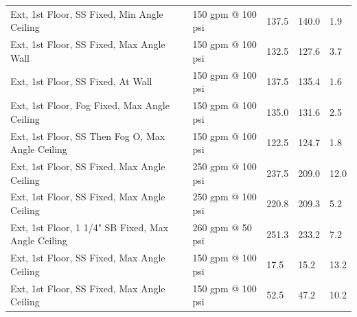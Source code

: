\documentclass{article}
\begin{document}
\begin{table}[]
\begin{tabular}{lllll}
Ext, 1st Floor, SS Fixed, Min Angle Ceiling           & 150 gpm @ 100 psi                   & 137.5                                  & 140.0                                   & 1.9                                     \\
Ext, 1st Floor, SS Fixed, Max Angle Wall              & 150 gpm @ 100 psi                   & 132.5                                  & 127.6                                   & 3.7                                     \\
Ext, 1st Floor, SS Fixed, At Wall                     & 150 gpm @ 100 psi                   & 137.5                                  & 135.4                                   & 1.6                                     \\
Ext, 1st Floor, Fog Fixed, Max Angle Ceiling          & 150 gpm @ 100 psi                   & 135.0                                  & 131.6                                   & 2.5                                     \\
Ext, 1st Floor, SS Then Fog O, Max Angle Ceiling      & 150 gpm @ 100 psi                   & 122.5                                  & 124.7                                   & 1.8                                     \\
Ext, 1st Floor, SS Fixed, Max Angle Ceiling           & 250 gpm @ 100 psi                   & 237.5                                  & 209.0                                   & 12.0                                    \\
Ext, 1st Floor, SS Fixed, Max Angle Ceiling           & 250 gpm @ 100 psi                   & 220.8                                  & 209.3                                   & 5.2                                     \\
Ext, 1st Floor, 1 1/4" SB Fixed, Max Angle Ceiling    & 260 gpm @ 50 psi                    & 251.3                                  & 233.2                                   & 7.2                                     \\
Ext, 1st Floor, SS Fixed, Max Angle Ceiling           & 150 gpm @ 100 psi                   & 17.5                                   & 15.2                                    & 13.2                                    \\
Ext, 1st Floor, SS Fixed, Max Angle Ceiling           & 150 gpm @ 100 psi                   & 52.5                                   & 47.2                                    & 10.2                                    \\

\end{tabular}
\end{table}
\end{document}

